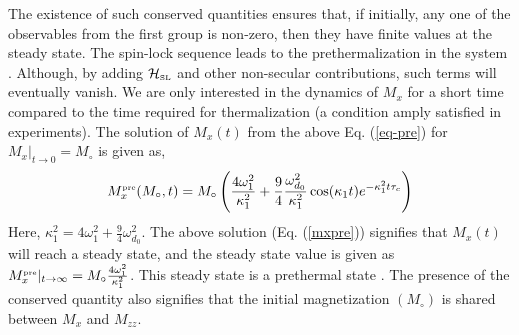 \documentclass[pra,aps,preprint,floatfix]{revtex4-1}
\newcommand{\hsl}{\mathcal{H}_{\scriptscriptstyle \rm SL}}
\newcommand{\sts}{\vert_{t\rightarrow\infty}}
\newcommand{\stoo}{\vert_{t\rightarrow 0}}
\begin{document}
The existence of such conserved quantities ensures that, if initially, any one of the observables from the first group 
is non-zero, then they have finite values at the steady state. The spin-lock sequence leads to the prethermalization 
in the system \cite{beatrez_floquet_2021,saha_cascaded_2023}. Although, by adding $\hsl$ and other non-secular
contributions, such terms will eventually 
vanish. We are only interested in the dynamics of $M_x$ for a short time compared to the time required for
thermalization (a condition amply satisfied in experiments). The solution 
of $M_x(t)$ from the above Eq. (\ref{eq-pre}) for $M_x \stoo = M_\circ$ is given as,
\begin{eqnarray}\label{mxpre}
M_x^{\scriptscriptstyle \rm pre} (M_\circ, t) = M_\circ \left(\frac{4 \omega_1^2}{\kappa_1^2} + \frac{9}{4}\frac{\omega_{d_0}^2}{\kappa_1^2} \cos (\kappa_1 t) e^{- \kappa_1^2 t \tau_c}\right) 
\end{eqnarray}  
Here, $\kappa_1^2 = 4 \omega_1^2 + \frac{9}{4}\omega_{d_0}^2$.
The above solution (Eq. (\ref{mxpre})) signifies that $M_x(t)$ will reach a steady state, and the steady state value 
is given as $M_x^{\scriptscriptstyle \rm pre}\sts = M_\circ \frac{4 \omega_1^2}{\kappa_1^2}$. This steady
state is a prethermal state \cite{saha_cascaded_2023}. The presence of the conserved quantity also signifies that the 
initial magnetization $(M_\circ)$ is shared between $M_x$ and $M_{zz}$. 
\end{document}
